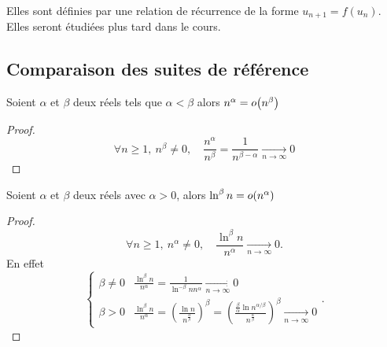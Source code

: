 Elles sont définies par une relation de récurrence de la forme \(u_{n+1}=f(u_n)\). Elles seront étudiées plus tard dans le cours.

\subsection{Comparaison des suites de référence}

\begin{prop}
  Soient \(\alpha\) et \(\beta\) deux réels tels que \(\alpha < \beta\) alors \(n^\alpha = o\mathopen{}\left(n^\beta\right)\)
\end{prop}
\begin{proof}
  \begin{equation}
      \forall n \geqslant 1, \ n^\beta \neq 0, \quad \frac{n^\alpha}{n^\beta}=\frac{1}{n^{\beta-\alpha}} \underset{n\to \infty}{\longrightarrow} 0
  \end{equation}
\end{proof}

\begin{prop}
  Soient \(\alpha\) et \(\beta\) deux réels avec \(\alpha>0\), alors \(\ln^\beta n = o\mathopen{}\left(n^\alpha\right)\)
\end{prop}
\begin{proof}
  \begin{equation}
    \forall n \geqslant 1, \ n^\alpha \neq 0, \quad \frac{\ln^\beta n}{n^\alpha} \underset{n\to \infty}{\longrightarrow} 0.
  \end{equation}
En effet
\begin{equation}
  \begin{cases}
    \beta \neq 0 & \frac{\ln^\beta n}{n^\alpha}=\frac{1}{\ln^{-\beta} n n^\alpha} \underset{n\to \infty}{\longrightarrow} 0 \\
    \beta > 0 & \frac{\ln^\beta n}{n^\alpha} = \left(\frac{\ln n}{n^{\frac{\alpha}{\beta}}}\right)^\beta = \left(\frac{\frac{\beta}{\alpha}\ln n^{\alpha/\beta}}{n^{\frac{\alpha}{\beta}}}\right)^\beta \underset{n\to \infty}{\longrightarrow} 0
  \end{cases}.
\end{equation}
\end{proof}

